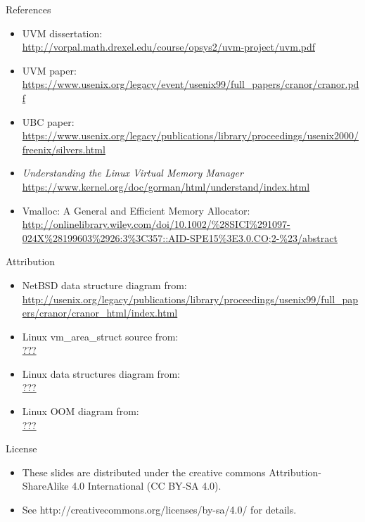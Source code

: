 \documentclass[aspectratio=169]{beamer}
\newcommand{\bi}{\begin{itemize}}
\newcommand{\ei}{\end{itemize}}
\begin{document}
\begin{frame}[noframenumbering]{References}
  \small
  \bi
\item UVM dissertation:\\
  \url{http://vorpal.math.drexel.edu/course/opsys2/uvm-project/uvm.pdf}
\item UVM paper:\\
  {\footnotesize\url{https://www.usenix.org/legacy/event/usenix99/full_papers/cranor/cranor.pdf}}
\item UBC paper:\\
  \url{https://www.usenix.org/legacy/publications/library/proceedings/usenix2000/freenix/silvers.html}
\item \textsl{Understanding the Linux Virtual Memory Manager}\\
  \url{https://www.kernel.org/doc/gorman/html/understand/index.html}
\item Vmalloc: A General and Efficient Memory Allocator:\\
  \url{http://onlinelibrary.wiley.com/doi/10.1002/\%28SICI\%291097-024X\%28199603\%2926:3\%3C357::AID-SPE15\%3E3.0.CO;2-\%23/abstract}
  \ei
\end{frame}

\begin{frame}[noframenumbering]{Attribution}
  \bi
\item NetBSD data structure diagram from:\\
  {\tiny\url{http://usenix.org/legacy/publications/library/proceedings/usenix99/full_papers/cranor/cranor_html/index.html}}
\item Linux vm\_area\_struct source from:\\
  \url{???}
\item Linux data structures diagram from:\\
  \url{???}
\item Linux OOM diagram from:\\
  \url{???}
  \ei
\end{frame}

\begin{frame}[noframenumbering]{License}
  \bi
\item These slides are distributed under the creative commons
  Attribution-ShareAlike 4.0 International (CC BY-SA 4.0).
\item See http://creativecommons.org/licenses/by-sa/4.0/ for details.
  \ei
\end{frame}
\end{document}
